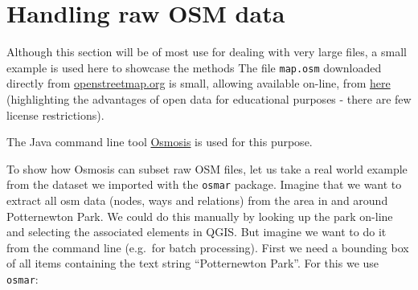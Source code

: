 \documentclass[]{article}
\begin{document}
\section{Handling raw OSM data}

Although this section will be of most use for dealing with very large
files, a small example is used here to showcase the methods The file
\texttt{map.osm} downloaded directly from
\href{http://www.openstreetmap.org}{openstreetmap.org} is small,
allowing available on-line, from
\href{https://github.com/Robinlovelace/osm-tutorial/blob/master/data/map.osm?raw=true}{here}
(highlighting the advantages of open data for educational purposes -
there are few license restrictions).

The Java command line tool
\href{http://wiki.openstreetmap.org/wiki/Osmosis}{Osmosis} is used for
this purpose.

To show how Osmosis can subset raw OSM files, let us take a real world
example from the dataset we imported with the \texttt{osmar} package.
Imagine that we want to extract all osm data (nodes, ways and relations)
from the area in and around Potternewton Park. We could do this manually
by looking up the park on-line and selecting the associated elements in
QGIS. But imagine we want to do it from the command line (e.g.~for batch
processing). First we need a bounding box of all items containing the
text string ``Potternewton Park''. For this we use \texttt{osmar}:
\end{document}
